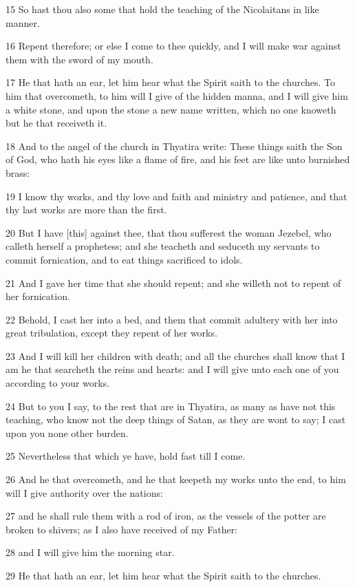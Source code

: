 \par 15 So hast thou also some that hold the teaching of the Nicolaitans in like manner.
\par 16 Repent therefore; or else I come to thee quickly, and I will make war against them with the sword of my mouth.
\par 17 He that hath an ear, let him hear what the Spirit saith to the churches. To him that overcometh, to him will I give of the hidden manna, and I will give him a white stone, and upon the stone a new name written, which no one knoweth but he that receiveth it.
\par 18 And to the angel of the church in Thyatira write: These things saith the Son of God, who hath his eyes like a flame of fire, and his feet are like unto burnished brass:
\par 19 I know thy works, and thy love and faith and ministry and patience, and that thy last works are more than the first.
\par 20 But I have [this] against thee, that thou sufferest the woman Jezebel, who calleth herself a prophetess; and she teacheth and seduceth my servants to commit fornication, and to eat things sacrificed to idols.
\par 21 And I gave her time that she should repent; and she willeth not to repent of her fornication.
\par 22 Behold, I cast her into a bed, and them that commit adultery with her into great tribulation, except they repent of her works.
\par 23 And I will kill her children with death; and all the churches shall know that I am he that searcheth the reins and hearts: and I will give unto each one of you according to your works.
\par 24 But to you I say, to the rest that are in Thyatira, as many as have not this teaching, who know not the deep things of Satan, as they are wont to say; I cast upon you none other burden.
\par 25 Nevertheless that which ye have, hold fast till I come.
\par 26 And he that overcometh, and he that keepeth my works unto the end, to him will I give authority over the nations:
\par 27 and he shall rule them with a rod of iron, as the vessels of the potter are broken to shivers; as I also have received of my Father:
\par 28 and I will give him the morning star.
\par 29 He that hath an ear, let him hear what the Spirit saith to the churches.


